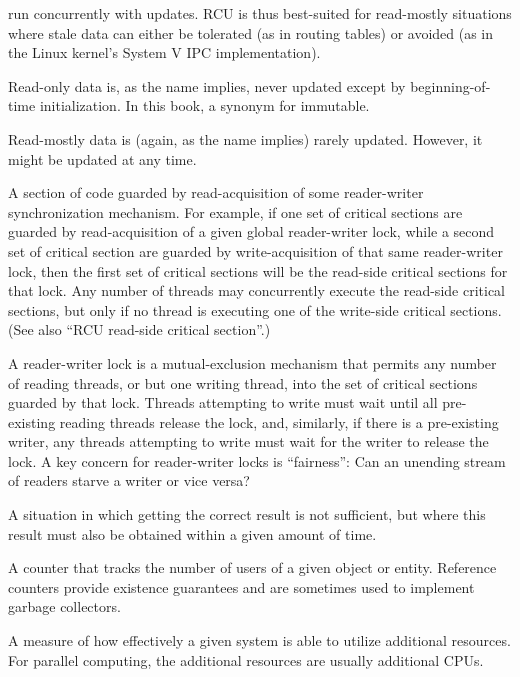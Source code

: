 \begin{description}
	run concurrently with updates.
	RCU is thus best-suited for read-mostly situations where
	stale data can either be tolerated (as in routing tables)
	or avoided (as in the Linux kernel's System V IPC implementation).
\item[\IXG{Read Only}:]
	Read-only data is, as the name implies, never updated except
	by beginning-of-time initialization.
	In this book, a synonym for immutable.
\item[\IXG{Read Mostly}:]
	Read-mostly data is (again, as the name implies) rarely updated.
	However, it might be updated at any time.
\item[\IXGh{Read-Side}{Critical Section}:]
	A section of code guarded by read-acquisition of
	some reader-writer synchronization mechanism.
	For example, if one set of critical sections are guarded by
	read-acquisition of
	a given global reader-writer lock, while a second set of critical
	section are guarded by write-acquisition of that same reader-writer
	lock, then the first set of critical sections will be the
	read-side critical sections for that lock.
	Any number of threads may concurrently execute the read-side
	critical sections, but only if no thread is executing one of
	the write-side critical sections.
	(See also ``RCU read-side critical section''.)
\item[\IXGh{Reader-Writer}{Lock}:]
	A reader-writer lock is a mutual-exclusion mechanism that
	permits any number of reading
	threads, or but one writing thread, into the set of critical
	sections guarded by that lock.
	Threads attempting to write must wait until all pre-existing
	reading threads release the lock, and, similarly, if there
	is a pre-existing writer, any threads attempting to write must
	wait for the writer to release the lock.
	A key concern for reader-writer locks is ``fairness'':
	Can an unending stream of readers starve a writer or vice versa?
\item[\IXG{Real Time}:]
	A situation in which getting the correct result is not sufficient,
	but where this result must also be obtained within a given amount
	of time.
\item[\IXG{Reference Count}:]
	A counter that tracks the number of users of a given object or
	entity.
	Reference counters provide existence guarantees and are sometimes
	used to implement garbage collectors.
\item[\IXG{Scalability}:]
	A measure of how effectively a given system is able to utilize
	additional resources.
	For parallel computing, the additional resources are usually
	additional CPUs.

\end{description}
